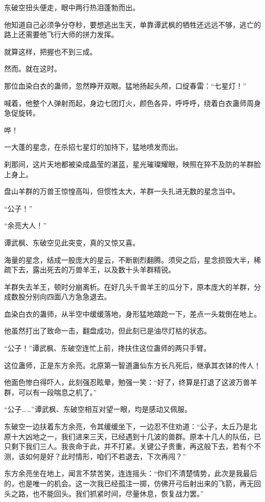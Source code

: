 \begin{this_body}
东破空扭头便走，眼中两行热泪蓬勃而出。

他知道自己必须争分夺秒，要想逃出生天，单靠谭武枫的牺牲还远远不够，逃亡的路上还需要他飞行大师的拼力发挥。

就算这样，把握也不到三成。

然而。就在这时。

那位血染白衣的蛊师，忽然睁开双眼。猛地扬起头颅，口绽春雷：“七星灯！”

喊着，他整个人弹射而起，身边七团灯火，颜色各异，呼呼呼，绕着白衣蛊师周身急促旋转。

哗！

一大蓬的星念，在杀招七星灯的加持下，猛地喷发而出。

刹那间，这片天地都被染成晶莹的湛蓝，星光璀璨耀眼，映照在猝不及防的羊群脸上身上。

盘山羊群的万兽王惊惶高叫，但惯性太大，羊群一头扎进无数的星念当中。

“公子！”

“余亮大人！”

谭武枫、东破空见此突变，真的又惊又喜。

海量的星念，结成一股庞大的星云，不断剧烈翻腾。须臾之后，星念损毁大半，稀疏下去，露出死去的万兽羊王，以及数十头羊群精锐。

羊群失去羊王，顿时分崩离析。在好几头千兽羊王的瓜分下，原本庞大的羊群，分成数股分别向四面八方急急退去。

血染白衣的蛊师，从半空中缓缓落地，身形猛地踉跄一下，差点一头栽倒在地上。

他虽然打出了致命一击，翻盘成功，但此刻已是油尽灯枯的状态。

“公子！”谭武枫、东破空连忙上前，搀扶住这位蛊师的两只手臂。

这位蛊师，正是东方余亮。北原第一智道蛊仙东方长凡死后，继承其衣钵的传人！

他面色惨白得吓人，此刻强忍眩晕，勉强一笑：“好了，终算是打退了这波万兽羊群，可以有一段喘息之机了。”

“公子……”谭武枫、东破空相互对望一眼，均是感动又佩服。

东破空一边扶着东方余亮，令其缓缓坐下，一边忍不住劝道：“公子，太丘乃是北原十大凶地之一，我们进来三天，已经遇到十几波的兽群。原本十几人的队伍，已只剩下我们三人。我丧命于此，并不打紧。关键公子贵重，再这般下去，若有个不测，该如何是好？此时情形，咱们不若退去，下次再闯？”

东方余亮坐在地上，闻言不禁苦笑，连连摇头：“你们不清楚情势，此次是我最后的，也是唯一的机会。这一次我已经孤注一掷，仿佛开弓后射出来的飞箭，再无回头之路，也不能回头。我们抓紧时间，尽量休息，恢复战力罢。”


\end{this_body}
